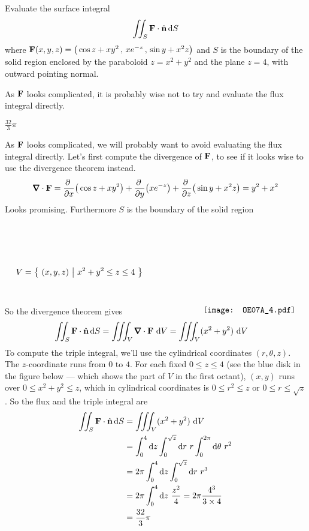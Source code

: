 \begin{question}[M317 2007A] %
Evaluate the surface integral
\begin{equation*}
\iint_S \mathbf{F}\cdot\hat{\mathbf{n}}\,\mathrm{d}S
\end{equation*}
where $\mathbf{F}(x, y, z) = \big(\cos z + xy^2\,,\, xe^{-z}\,,\, \sin y + x^2 z\big)$ 
and $S$ is the boundary of the solid region
enclosed by the paraboloid $z = x^2 + y^2$ and the plane $z = 4$, with outward pointing normal.
\end{question}

\begin{hint} 
As $\mathbf{F}$ looks complicated, it is probably wise not to try and evaluate
the flux integral directly.
\end{hint}

\begin{answer} 
$\frac{32}{3}\pi$
\end{answer}

\begin{solution} 
As $\mathbf{F}$ looks complicated, we will probably want to avoid evaluating
the flux integral directly. Let's first compute the divergence of $\mathbf{F}$,
to see if it looks wise to use the divergence theorem instead.
\begin{align*}
\vnabla\cdot\vF = 
   \pdiff{}{x}\big(\cos z + xy^2\big)
   +\pdiff{}{y}\big(xe^{-z}\big)
   +\pdiff{}{z}\big(\sin y + x^2 z\big)
=y^2+x^2
\end{align*}
Looks promising. Furthermore $S$ is the boundary of the solid region
\begin{equation*}
V=\Set{(x,y,z)}{x^2+y^2\le z\le 4}
\hskip1.0in
\raisebox{-45pt}[65pt][30pt]{\texttt{[image: OE07A\_4.pdf]}}
\end{equation*}
So the divergence theorem gives
\begin{align*}
\dblInt_S \vF \cdot\hn\,\dee{S}
&=\tripInt_V \vnabla\cdot\vF\ \dee{V} 
=\tripInt_V  (x^2+y^2)\ \dee{V} 
\end{align*}
To compute the triple integral, we'll use the cylindrical coordinates $(r,\theta,z)$.
The $z$-coordinate runs from $0$ to $4$. For each fixed $0\le z \le 4$
(see the blue disk in the figure below --- which shows the part of $V$ in the first octant),
$(x,y)$ runs over $0\le x^2+y^2 \le z$, which in cylindrical coordinates
is $0\le r^2\le z$ or $0\le r\le\sqrt{z}$. 
So the flux and the triple integral are
\begin{align*}
\dblInt_S \vF \cdot\hn\,\dee{S}
&=\tripInt_V  (x^2+y^2)\ \dee{V} \\
&=\int_0^4\dee{z}\int_0^{\sqrt{z}}\dee{r}\ r\int_0^{2\pi}\dee{\theta}\   r^2 \\
&=2\pi \int_0^4\dee{z}\int_0^{\sqrt{z}}\dee{r}\ r^3 \\
&=2\pi \int_0^4\dee{z}\ \frac{z^2}{4}
=2\pi \frac{4^3}{3\times 4}\\
&=\frac{32}{3}\pi
\end{align*}


\end{solution}

